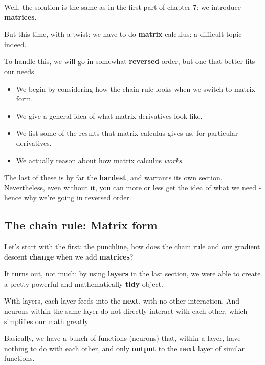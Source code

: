         Well, the solution is the same as in the first part of chapter 7: we introduce \textbf{matrices}.
        
        But this time, with a twist: we have to do \textbf{matrix} calculus: a difficult topic indeed.
        
        To handle this, we will go in somewhat \textbf{reversed} order, but one that better fits our needs.
        
        \begin{itemize}
            \item We begin by considering how the chain rule looks when we switch to matrix form.
            \item We give a general idea of what matrix derivatives look like.
            \item We list some of the results that matrix calculus gives us, for particular derivatives.
            \item We actually reason about how matrix calculus \textit{works}.
        \end{itemize}
        
        The last of these is by far the \textbf{hardest}, and warrants its own section. Nevertheless, even without it, you can more or less get the idea of what we need - hence why we're going in reversed order.

    \secdiv
    
    \subsection{The chain rule: Matrix form}
    
        Let's start with the first: the punchline, how does the chain rule and our gradient descent \textbf{change} when we add \textbf{matrices}?
        
        It turns out, not much: by using \textbf{layers} in the last section, we were able to create a pretty powerful and mathematically \textbf{tidy} object.
        
        With layers, each layer feeds into the \textbf{next}, with no other interaction. And neurons within the same layer do not directly interact with each other, which simplifies our math greatly.
        
        Basically, we have a bunch of functions (neurons) that, within a layer, have nothing to do with each other, and only \textbf{output} to the \textbf{next} layer of similar functions.
        
